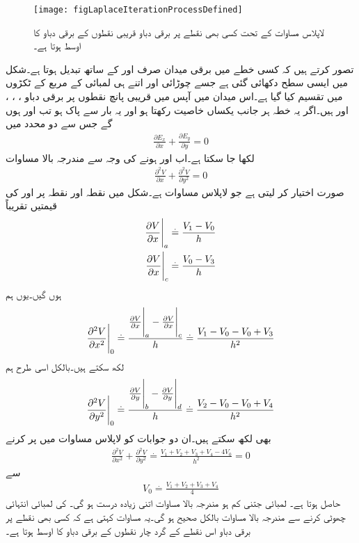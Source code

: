 \begin{figure}
\centering
\texttt{[image: figLaplaceIterationProcessDefined]}
\caption{لاپلاس مساوات کے تحت کسی بھی نقطے پر برقی دباو قریبی نقطوں کے برقی دباو کا اوسط ہوتا ہے۔}
\label{شکل_لاپلاس_برقی_دباو_اوسط_قیمت_ہی_ہے}
\end{figure}
تصور کرتے ہیں کہ کسی خطے میں برقی میدان صرف  اور  کے ساتھ تبدیل ہوتا ہے۔شکل  میں ایسی سطح دکھائی گئی ہے جسے  چوڑائی اور اتنے ہی لمبائی کے مربع کے ٹکڑوں میں تقسیم کیا گیا ہے۔اس میدان میں آپس میں قریبی پانچ نقطوں پر برقی دباو ، ، ،  اور   ہیں۔اگر یہ خطہ ہر جانب یکساں خاصیت رکھتا ہو اور یہ بار سے پاک ہو تب  اور  ہوں گے جس سے دو محدد میں
\begin{align*}
\frac{\partial E_x}{\partial x}+\frac{\partial E_y}{\partial y}=0
\end{align*}
لکھا جا سکتا ہے۔اب  اور  ہونے کی وجہ سے مندرجہ بالا مساوات 
\begin{align*}
\frac{\partial^2 V}{\partial x}+\frac{\partial^2 V}{\partial y^2}=0
\end{align*}
صورت اختیار کر لیتی ہے جو لاپلاس مساوات ہے۔شکل  میں نقطہ  اور نقطہ  پر  اور  کی قیمتیں تقریباً
\begin{align*}
\eval{\frac{\partial V}{\partial x}}_a&\overset{.}{=}\frac{V_1-V_0}{h}\\
\eval{\frac{\partial V}{\partial x}}_c&\overset{.}{=}\frac{V_0-V_3}{h}
\end{align*}
ہوں گیں۔یوں ہم
\begin{align*}
\eval{\frac{\partial^2 V}{\partial x^2}}_0\overset{.}{=}\frac{\eval{\frac{\partial V}{\partial x}}_a-\eval{\frac{\partial V}{\partial x}}_c}{h}
\overset{.}{=}\frac{V_1-V_0-V_0+V_3}{h^2}
\end{align*}
لکھ سکتے ہیں۔بالکل اسی طرح ہم
\begin{align*}
\eval{\frac{\partial^2 V}{\partial y^2}}_0\overset{.}{=}\frac{\eval{\frac{\partial V}{\partial y}}_b-\eval{\frac{\partial V}{\partial y}}_d}{h}
\overset{.}{=}\frac{V_2-V_0-V_0+V_4}{h^2}
\end{align*}
بھی لکھ سکتے ہیں۔ان دو جوابات کو لاپلاس مساوات میں پر کرنے
\begin{align*}
\frac{\partial^2 V}{\partial x^2}+\frac{\partial^2 V}{\partial y^2}\overset{.}{=}\frac{V_1+V_2+V_3+V_4-4V_0}{h^2}=0
\end{align*}
سے
\begin{align}\label{مساوات_لاپلاس_عددی_دہرانے_کا_طریقہ}
V_0\overset{.}{=}\frac{V_1+V_2+V_3+V_4}{4}
\end{align}
حاصل ہوتا ہے۔ لمبائی جتنی کم ہو مندرجہ بالا مساوات اتنی زیادہ درست ہو گی۔ کی لمبائی انتہائی چھوٹی کرنے سے مندرجہ بالا مساوات بالکل صحیح ہو گی۔یہ مساوات  کہتی ہے کہ کسی بھی نقطے پر برقی دباو اس نقطے کے گرد چار نقطوں کے برقی دباو کا اوسط ہوتا ہے۔

